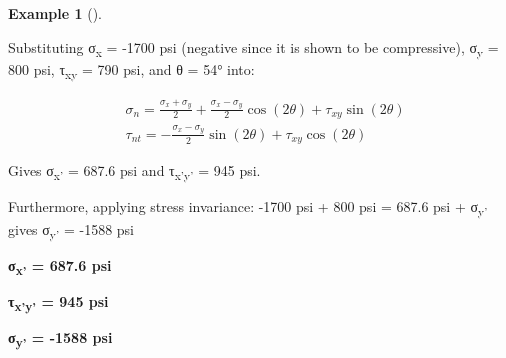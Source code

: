 \documentclass[
  letterpaper,
  DIV=11,
  numbers=noendperiod]{scrreprt}
\theoremstyle{definition}
\newtheorem{example}{Example}[chapter]
\theoremstyle{remark}
\begin{document}
\begin{tcolorbox}
\begin{example}[]
\begin{tcolorbox}
Substituting σ\textsubscript{x} = -1700 psi (negative since it is shown
to be compressive), σ\textsubscript{y} = 800 psi, τ\textsubscript{xy} =
790 psi, and θ = 54° into:

\[
\begin{aligned}
& \sigma_n=\frac{\sigma_x+\sigma_y}{2}+\frac{\sigma_x-\sigma_y}{2} \cos (2 \theta)+\tau_{x y} \sin (2 \theta) \\
& \tau_{n t}=-\frac{\sigma_x-\sigma_y}{2} \sin (2 \theta)+\tau_{x y} \cos (2 \theta)
\end{aligned}
\]

Gives σ\textsubscript{x'} = 687.6 psi and τ\textsubscript{x'y'} = 945
psi.

Furthermore, applying stress invariance: -1700 psi + 800 psi = 687.6 psi
+ σ\textsubscript{y'} gives σ\textsubscript{y'} = -1588 psi

\textbf{σ\textsubscript{x'} = 687.6 psi}

\textbf{τ\textsubscript{x'y'} = 945 psi}

\textbf{σ\textsubscript{y'} = -1588 psi}

\end{tcolorbox}

\end{example}

\end{tcolorbox}
\end{document}
